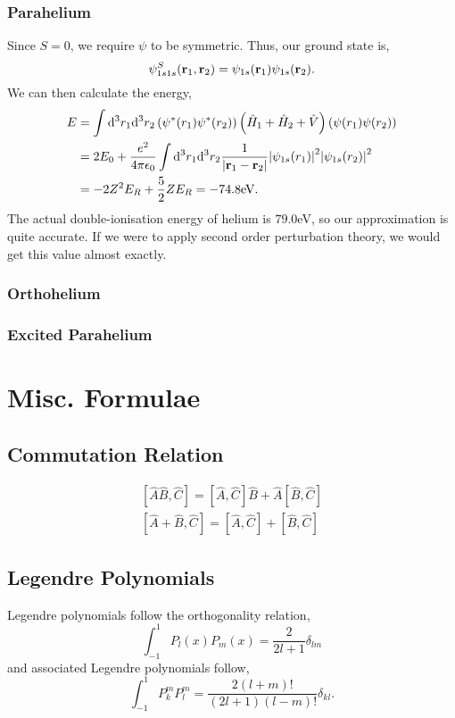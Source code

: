 \documentclass{book}
\begin{document}
\subsection{Parahelium}
Since $S = 0$, we require $\psi$ to be symmetric. Thus, our ground state is,
\begin{equation}
	\psi^S_{1s1s}(\vb{r}_1,\vb{r}_2) = \psi_{1s}(\vb{r}_1)\psi_{1s}(\vb{r}_2).
\end{equation}
We can then calculate the energy,
\begin{equation}
	\begin{split}
		E &= \int \dd^3r_1\dd^3r_2\left(\psi^*(r_1)\psi^*(r_2)\right)\left(\hat{H}_1 + \hat{H}_2 + \hat{V}\right)\left(\psi(r_1)\psi(r_2)\right) \\
		& = 2E_0 + \frac{e^2}{4\pi\epsilon_0}\int\dd^3r_1\dd^3r_2\frac{1}{\abs{\vb{r}_1 - \vb{r}_2}}\abs{\psi_{1s}(r_1)}^2\abs{\psi_{1s}(r_2)}^2 \\
		& = -2Z^2E_R + \frac{5}{2}ZE_R = -74.8\text{eV}.
	\end{split}
\end{equation}
The actual double-ionisation energy of helium is $79.0$eV, so our approximation is quite accurate. If we were to apply second order perturbation theory, we would get this value almost exactly. 
\subsection{Orthohelium}
\subsection{Excited Parahelium}

\appendix
\chapter{Misc. Formulae}
\section{Commutation Relation}
\begin{align}
	\left[\hat{A}\hat{B}, \hat{C}\right] = \left[\hat{A}, \hat{C}\right]\hat{B} + \hat{A}\left[\hat{B},\hat{C}\right] \\
	\left[\hat{A} + \hat{B}, \hat{C}\right] = \left[\hat{A}, \hat{C}\right] + \left[\hat{B},\hat{C}\right]
\end{align}
\section{Legendre Polynomials}
Legendre polynomials follow the orthogonality relation,
\begin{equation}
	\int_{-1}^1 P_l(x)P_m(x) = \frac{2}{2l+1}\delta_{lm}
\end{equation}
and associated Legendre polynomials follow,
\begin{equation}
	\int_{-1}^1 P_k^mP_l^m = \frac{2(l+m)!}{(2l+1)(l-m)!}\delta_{kl}.
\end{equation}
\end{document}
